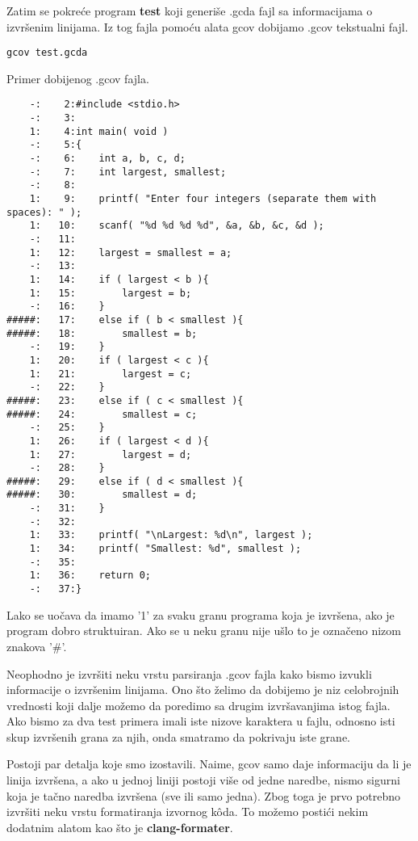 \documentclass[a4paper]{article}
\begin{document}
Zatim se pokreće program \textbf{test} koji generiše .gcda fajl sa informacijama o izvršenim linijama. Iz tog fajla pomoću alata gcov dobijamo .gcov tekstualni fajl.

\begin{verbatim}
gcov test.gcda
\end{verbatim}

Primer dobijenog .gcov fajla.
\begin{lstlisting}
	-:    2:#include <stdio.h>
	-:    3:
	1:    4:int main( void )
	-:    5:{   
	-:    6:    int a, b, c, d;
	-:    7:    int largest, smallest;
	-:    8:
	1:    9:    printf( "Enter four integers (separate them with spaces): " );
	1:   10:    scanf( "%d %d %d %d", &a, &b, &c, &d );
	-:   11:
	1:   12:    largest = smallest = a;
	-:   13:
	1:   14:    if ( largest < b ){
	1:   15:        largest = b;
	-:   16:    }
#####:   17:    else if ( b < smallest ){
#####:   18:        smallest = b;
	-:   19:    }
	1:   20:    if ( largest < c ){
	1:   21:        largest = c;
	-:   22:    }
#####:   23:    else if ( c < smallest ){
#####:   24:        smallest = c;
	-:   25:    }
	1:   26:    if ( largest < d ){
	1:   27:        largest = d;
	-:   28:    }
#####:   29:    else if ( d < smallest ){
#####:   30:        smallest = d;
	-:   31:    }
	-:   32:
	1:   33:    printf( "\nLargest: %d\n", largest );
	1:   34:    printf( "Smallest: %d", smallest );
	-:   35:
	1:   36:    return 0;
	-:   37:}
\end{lstlisting}

Lako se uočava da imamo '1' za svaku granu programa koja je izvršena, ako je program dobro struktuiran. Ako se u neku granu nije ušlo to je označeno nizom znakova '\#'.

Neophodno je izvršiti neku vrstu parsiranja .gcov fajla kako bismo izvukli informacije o izvršenim linijama. Ono što želimo da dobijemo je niz celobrojnih vrednosti koji dalje možemo da poredimo sa drugim izvršavanjima istog fajla. Ako bismo za dva test primera imali iste nizove karaktera u fajlu, odnosno isti skup izvršenih grana za njih, onda smatramo da pokrivaju iste grane. 

Postoji par detalja koje smo izostavili. Naime, gcov samo daje informaciju da li je linija izvršena, a ako u jednoj liniji postoji više od jedne naredbe, nismo sigurni koja je tačno naredba izvršena (sve ili samo jedna). Zbog toga je prvo potrebno izvršiti neku vrstu formatiranja izvornog kôda. To možemo postići nekim dodatnim alatom kao što je \textbf{clang-formater}.
\end{document}
